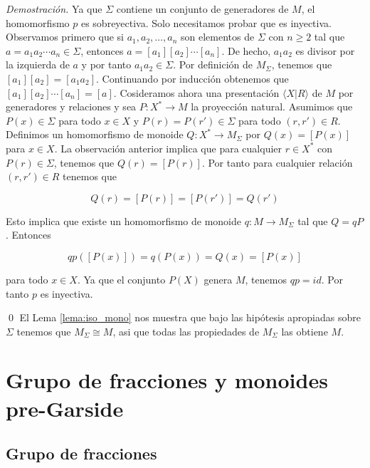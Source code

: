 \documentclass[12pt]{article}
\theoremstyle{definition}
\begin{document}
\textit{Demostración.} Ya que $\Sigma$ contiene un conjunto de generadores de $M$, el homomorfismo $p$ es sobreyectiva. Solo necesitamos probar que es inyectiva. Observamos primero que si $a_1,a_2,\ldots,a_n$ son elementos de $\Sigma$ con $n\geq 2$ tal que $a=a_1a_2\cdots a_n\in\Sigma$, entonces $a=[a_1][a_2]\cdots [a_n]$. De hecho, $a_1a_2$ es divisor por la izquierda de $a$ y por tanto $a_1a_2\in\Sigma$. Por definición de $M_\Sigma$, tenemos que $[a_1][a_2]=[a_1a_2]$. Continuando por inducción obtenemos que $[a_1][a_2]\cdots[a_n]=[a]$.
\newline
\newline
Cosideramos ahora una presentación $\langle X| R\rangle$ de $M$ por generadores y relaciones y sea $P:X^*\rightarrow M$ la proyección natural. Asumimos que $P(x)\in\Sigma$ para todo $x\in X$ y $P(r)=P(r')\in\Sigma$ para todo $(r,r')\in R$. Definimos un homomorfismo de monoide $Q:X^*\rightarrow M_\Sigma$ por $Q(x)=[P(x)]$ para $x\in X$. La observación anterior implica que para cualquier $r\in X^*$ con $P(r)\in\Sigma$, tenemos que $Q(r)=[P(r)]$. Por tanto para cualquier relación $(r,r')\in R$ tenemos que

$$Q(r)=[P(r)]=[P(r')]=Q(r')$$

Esto implica que existe un homomorfismo de monoide $q:M\rightarrow M_\Sigma$ tal que $Q=qP$. Entonces

$$qp([P(x)])=q(P(x))=Q(x)=[P(x)]$$

para todo $x\in X$. Ya que el conjunto $P(X)$ genera $M$, tenemos $qp=id$. Por tanto $p$ es inyectiva.

\qed
\newline
\newline
El Lema \ref{lema:iso_mono} nos muestra que bajo las hipótesis apropiadas sobre $\Sigma$ tenemos que $M_\Sigma\cong M$, asi que todas las propiedades de $M_\Sigma$ las obtiene $M$.




\section{Grupo de fracciones y monoides pre-Garside}
\subsection{Grupo de fracciones}
\end{document}
